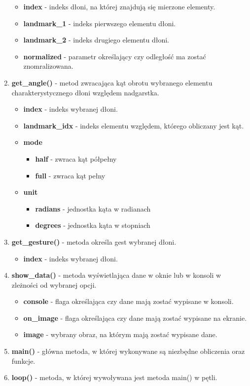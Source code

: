 \begin{enumerate}
\begin{itemize}
        \item \textbf{index} - indeks dłoni, na której znajdują się mierzone elementy. 
        \item \textbf{landmark\_1} - indeks pierwszego elementu dłoni. 
        \item \textbf{landmark\_2} - indeks drugiego elementu dłoni. 
        \item \textbf{normalized} - parametr określający czy odległość ma zostać znomralizowana. 
    \end{itemize}
    \item \textbf{get\_angle()} - metod zwracająca kąt obrotu wybranego elementu charakterystycznego dłoni względem nadgarstka. 
    \begin{itemize}
        \item \textbf{index} - indeks wybranej dłoni. 
        \item \textbf{landmark\_idx} - indeks elementu względem, którego obliczany jest kąt. 
        \item \textbf{mode}
        \begin{itemize}
            \item \textbf{half} - zwraca kąt półpełny
            \item \textbf{full} - zwraca kąt pełny
        \end{itemize}
        \item \textbf{unit}
        \begin{itemize}
            \item \textbf{radians} - jednostka kąta w radianach
            \item \textbf{degrees} - jednostka kąta w stopniach
        \end{itemize}
    \end{itemize}
    \item \textbf{get\_gesture()} - metoda określa gest wybranej dłoni. 
    \begin{itemize}
        \item \textbf{index} - indeks wybranej dłoni. 
    \end{itemize}
    \item \textbf{show\_data()} - metoda wyświetlająca dane w oknie lub w konsoli w zleżności od wybranej opcji. 
    \begin{itemize}
        \item \textbf{console} - flaga określająca czy dane mają zostać wypisane w konsoli.
        \item \textbf{on\_image} - flaga określająca czy dane mają zostać wypisane na ekranie. 
        \item \textbf{image} - wybrany obraz, na którym mają zostać wypisane dane.
    \end{itemize}
    \item \textbf{main()} - główna metoda, w której wykonywane są niezbędne obliczenia oraz funkcje. 
    \item \textbf{loop()} - metoda, w której wywoływana jest metoda main() w pętli. 
\end{enumerate}

